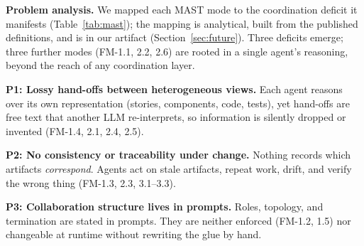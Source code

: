 \documentclass[10pt,conference]{IEEEtran}
\theoremstyle{definition}
\begin{document}
\smallskip\noindent\textbf{Problem analysis.} We mapped each MAST mode to
the coordination deficit it manifests (Table~\ref{tab:mast}); the mapping
is analytical, built from the published definitions, and is in our artifact
(Section~\ref{sec:future}). Three deficits emerge; three further modes
(FM-1.1, 2.2, 2.6) are rooted in a single agent's reasoning, beyond the
reach of any coordination layer.

\noindent\textbf{P1: Lossy hand-offs between heterogeneous views.} Each
agent reasons over its own representation (stories, components, code,
tests), yet hand-offs are free text that another LLM re-interprets, so
information is silently dropped or invented (FM-1.4, 2.1, 2.4, 2.5).

\noindent\textbf{P2: No consistency or traceability under change.} Nothing
records which artifacts \emph{correspond}. Agents act on stale artifacts,
repeat work, drift, and verify the wrong thing (FM-1.3, 2.3, 3.1--3.3).

\noindent\textbf{P3: Collaboration structure lives in prompts.} Roles,
topology, and termination are stated in prompts. They are neither enforced
(FM-1.2, 1.5) nor changeable at runtime without rewriting the glue by hand.
\end{document}

